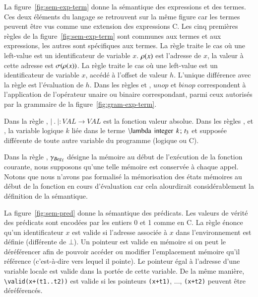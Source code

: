 La figure~\ref{fig:sem-exp-term} donne la sémantique des expressions et des
termes.
Ces deux éléments du langage se retrouvent sur la même figure car les termes
peuvent être vus comme une extension des expressions C.
Les cinq premières règles de la figure~\ref{fig:sem-exp-term} sont communes aux
termes et aux expressions, les autres sont spécifiques aux termes.
La règle  traite le cas où une left-value est un identificateur
de variable $x$.
$\rho(x)$ est l'adresse de $x$, la valeur à cette adresse est $\sigma(\rho(x))$.
La règle  traite le cas où une left-value est un identificateur
de variable $x$, accédé à l'offset de valeur $h$.
L'unique différence avec la règle  est l'évaluation de $h$.
Dans les règles  et , $\mathit{unop}$ et
$\mathit{binop}$ correspondent à l'application de l'opérateur unaire ou binaire
correspondant, parmi ceux autorisés par la grammaire de la
figure~\ref{fig:gram-exp-term}.

Dans la règle , $\lvert~.~\rvert : VAL \rightarrow VAL$ est la
fonction valeur absolue.
Dans les règles ,  et , la
variable logique $k$ liée dans le terme
$\mbox{\lstinline'\\lambda integer'}~k\semicolon~t_3$ et supposée différente de
toute autre variable du programme (logique ou C).

Dans la règle , $\gamma_{Beg_{\mathtt{f}}}$ désigne la mémoire au
début de l'exécution de la fonction courante, nous supposons
qu'une telle mémoire est conservée à chaque appel.
Notons que nous n'avons pas formalisé la mémorisation des états mémoires au
début de la fonction en cours d'évaluation car cela alourdirait considérablement
la définition de la sémantique.

La figure~\ref{fig:sem-pred} donne la sémantique des prédicats.
Les valeurs de vérité des prédicats sont encodées par les entiers 0 et 1 comme
en C.
La règle  énonce qu'un identificateur $x$ est valide
si l'adresse associée à $x$ dans l'environnement est définie (différente de
$\bot$).
Un pointeur est valide en mémoire si on peut le déréférencer afin de pouvoir
accéder ou modifier l'emplacement mémoire qu'il référence (c'est-à-dire vers
lequel il pointe).
Le pointeur égal à l'adresse d'une variable locale est valide dans la portée de
cette variable.
De la même manière, \lstinline'\valid(x+(t1..t2))' est valide si les pointeurs
\lstinline'(x+t1)', ..., \lstinline'(x+t2)' peuvent être déréférencés.

